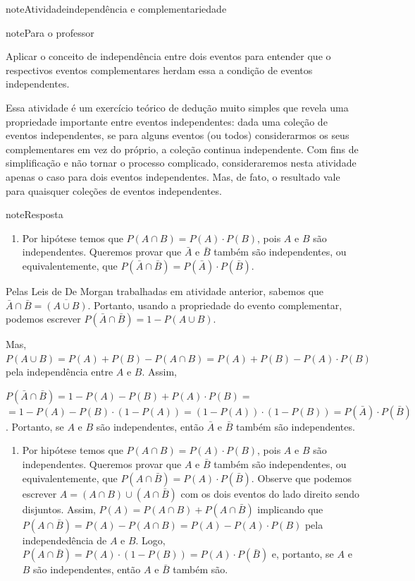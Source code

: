 \begin{sphinxadmonition}{note}{Atividade}{independência e complementariedade}
\label{ativ-independencia-e-complementaridade}

\begin{sphinxadmonition}{note}{Para o professor}

 Aplicar o conceito de independência entre dois eventos para entender que o respectivos eventos complementares herdam essa a condição de eventos independentes.

 Essa atividade é um exercício teórico de dedução muito simples que revela uma propriedade importante entre eventos independentes: dada uma coleção de eventos independentes, se para alguns eventos (ou todos) considerarmos os seus complementares em vez do próprio, a coleção continua independente. Com fins de simplificação e não tornar o processo complicado, consideraremos nesta atividade apenas o caso para dois eventos independentes. Mas, de fato, o resultado vale para quaisquer coleções de eventos independentes.

\begin{sphinxadmonition}{note}{Resposta}

\begin{enumerate}
\item {} 
Por hipótese temos que \(P(A\cap B)=P(A)\cdot P(B)\), pois \(A\)  e \(B\)  são independentes. Queremos provar que \(\bar{A}\) e \(\bar{B}\) também são independentes, ou equivalentemente, que \(P(\bar{A}\cap\bar{B})=P(\bar{A})\cdot P(\bar{B})\).

\end{enumerate}

Pelas Leis de De Morgan trabalhadas em atividade anterior, sabemos que \(\bar{A}\cap \bar{B}=\overline{(A\cup B)}\). Portanto, usando a propriedade do evento complementar, podemos escrever \(P(\bar{A}\cap \bar{B})=1-P(A\cup B)\).

Mas, \(P(A\cup B)=P(A)+P(B)-P(A\cap B)=P(A)+P(B)-P(A)\cdot P(B)\) pela independência entre \(A\) e \(B\). Assim,

\(P(\bar{A}\cap \bar{B})=1-P(A)-P(B)+P(A)\cdot P(B)=\)
\(=1-P(A) -P(B)\cdot (1-P(A))=(1-P(A))\cdot (1-P(B))=P(\bar{A})\cdot P(\bar{B})\).
Portanto, se \(A\) e \(B\) são independentes, então \(\bar{A}\) e \(\bar{B}\)  também são independentes.
\begin{enumerate}
\item {} 
Por hipótese temos que \(P(A\cap B)=P(A)\cdot P(B)\), pois \(A\)  e \(B\)  são independentes. Queremos provar que \({A}\) e \(\bar{B}\) também são independentes, ou equivalentemente, que \(P({A}\cap\bar{B})=P({A})\cdot P(\bar{B})\). Observe que podemos escrever \(A=(A\cap B)\cup (A\cap \bar{B})\) com os dois eventos do lado direito sendo disjuntos. Assim, \(P(A)=P(A\cap B)+P(A\cap \bar{B})\) implicando que \(P(A\cap \bar{B})=P(A)-P(A\cap B)=P(A)-P(A)\cdot P(B)\) pela independedência de \(A\) e \(B\). Logo, \(P(A\cap \bar{B})=P(A)\cdot (1-P(B))=P(A)\cdot P(\bar{B})\) e, portanto, se \(A\) e \(B\)  são independentes, então \(A\) e \(\bar{B}\) também são.


\end{enumerate}
\end{sphinxadmonition}
\end{sphinxadmonition}
\end{sphinxadmonition}
